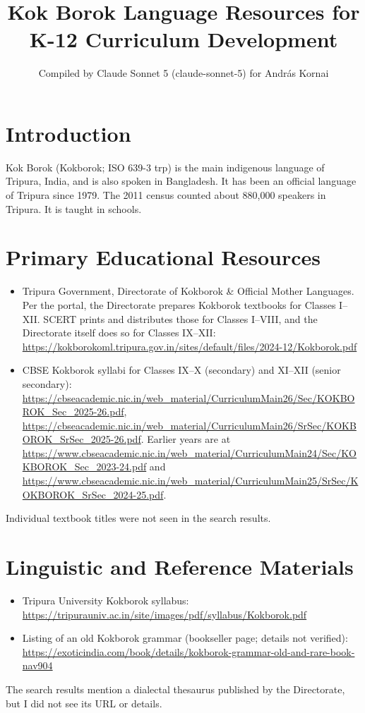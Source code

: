 \documentclass[12pt]{article}
\title{Kok Borok Language Resources for K-12 Curriculum Development}
\author{Compiled by Claude Sonnet 5 (claude-sonnet-5) for Andr\'as Kornai}
\date{}
\begin{document}
\maketitle

\section{Introduction}
Kok Borok (Kokborok; ISO 639-3 trp) is the main indigenous language of Tripura, India, and is also spoken in Bangladesh. It has been an official language of Tripura since 1979. The 2011 census counted about 880,000 speakers in Tripura. It is taught in schools.

\section{Primary Educational Resources}
\begin{itemize}
\item Tripura Government, Directorate of Kokborok \& Official Mother Languages. Per the portal, the Directorate prepares Kokborok textbooks for Classes I--XII. SCERT prints and distributes those for Classes I--VIII, and the Directorate itself does so for Classes IX--XII: \url{https://kokborokoml.tripura.gov.in/sites/default/files/2024-12/Kokborok.pdf}
\item CBSE Kokborok syllabi for Classes IX--X (secondary) and XI--XII (senior secondary): \url{https://cbseacademic.nic.in/web_material/CurriculumMain26/Sec/KOKBOROK_Sec_2025-26.pdf}, \url{https://cbseacademic.nic.in/web_material/CurriculumMain26/SrSec/KOKBOROK_SrSec_2025-26.pdf}. Earlier years are at \url{https://www.cbseacademic.nic.in/web_material/CurriculumMain24/Sec/KOKBOROK_Sec_2023-24.pdf} and \url{https://www.cbseacademic.nic.in/web_material/CurriculumMain25/SrSec/KOKBOROK_SrSec_2024-25.pdf}.
\end{itemize}
Individual textbook titles were not seen in the search results.

\section{Linguistic and Reference Materials}
\begin{itemize}
\item Tripura University Kokborok syllabus: \url{https://tripurauniv.ac.in/site/images/pdf/syllabus/Kokborok.pdf}
\item Listing of an old Kokborok grammar (bookseller page; details not verified): \url{https://exoticindia.com/book/details/kokborok-grammar-old-and-rare-book-nav904}
\end{itemize}
The search results mention a dialectal thesaurus published by the Directorate, but I did not see its URL or details.
\end{document}

